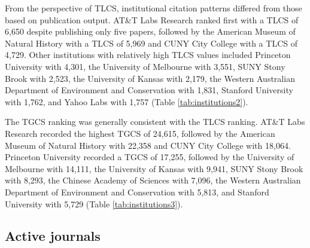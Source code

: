 \documentclass[authoryear,preprint,review,12pt]{elsarticle}
\begin{document}
From the perspective of TLCS, institutional citation patterns differed from those based on publication output. AT\&T Labs Research ranked first with a TLCS of 6,650 despite publishing only five papers, followed by the American Museum of Natural History with a TLCS of 5,969 and CUNY City College with a TLCS of 4,729. Other institutions with relatively high TLCS values included Princeton University with 4,301, the University of Melbourne with 3,551, SUNY Stony Brook with 2,523, the University of Kansas with 2,179, the Western Australian Department of Environment and Conservation with 1,831, Stanford University with 1,762, and Yahoo Labs with 1,757 (Table \ref{tab:institutions2}).

The TGCS ranking was generally consistent with the TLCS ranking. AT\&T Labs Research recorded the highest TGCS of 24,615, followed by the American Museum of Natural History with 22,358 and CUNY City College with 18,064. Princeton University recorded a TGCS of 17,255, followed by the University of Melbourne with 14,111, the University of Kansas with 9,941, SUNY Stony Brook with 8,293, the Chinese Academy of Sciences with 7,096, the Western Australian Department of Environment and Conservation with 5,813, and Stanford University with 5,729 (Table \ref{tab:institutions3}).

\subsection{Active journals}
\end{document}
